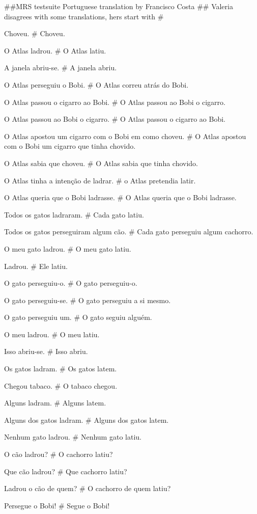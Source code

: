 ##MRS testsuite Portuguese translation by Francisco Costa
## Valeria disagrees with some translations, hers start with #

Choveu.
# Choveu.

O Atlas ladrou.
# O Atlas latiu.

A janela abriu-se.
# A janela abriu.

O Atlas perseguiu o Bobi.
# O Atlas correu atrás do Bobi.

O Atlas passou o cigarro ao Bobi.
# O Atlas passou ao Bobi o cigarro.

O Atlas passou ao Bobi o cigarro.
# O Atlas passou o cigarro ao Bobi.

O Atlas apostou um cigarro com o Bobi em como choveu.
# O Atlas apostou  com o Bobi um cigarro que tinha chovido.

O Atlas sabia que choveu.
# O Atlas sabia que tinha chovido.

O Atlas tinha a intenção de ladrar.
# o Atlas pretendia latir.

O Atlas queria que o Bobi ladrasse.
# O Atlas queria que o Bobi ladrasse.

Todos os gatos ladraram.
# Cada gato latiu.

Todos os gatos perseguiram algum cão.
# Cada gato perseguiu algum cachorro.

O meu gato ladrou.
# O meu gato latiu.

Ladrou.
# Ele latiu.

O gato perseguiu-o.
# O gato perseguiu-o.

O gato perseguiu-se.
# O gato perseguiu a si mesmo.

O gato perseguiu um.
# O gato seguiu alguém.

O meu ladrou.
# O meu latiu.

Isso abriu-se.
# Isso abriu.

Os gatos ladram.
# Os gatos latem.

Chegou tabaco.
# O tabaco chegou.

Alguns ladram.
# Alguns latem.

Alguns dos gatos ladram.
# Alguns dos gatos latem.

Nenhum gato ladrou.
# Nenhum gato latiu.

O cão ladrou?
# O cachorro latiu?

Que cão ladrou?
# Que cachorro latiu?

Ladrou o cão de quem?
# O cachorro de quem latiu?

Persegue o Bobi!
# Segue o Bobi!

